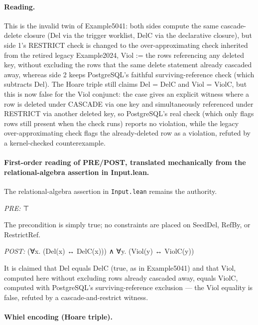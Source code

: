 \documentclass[10pt]{article}
\begin{document}
\paragraph{Reading.} This is the invalid twin of Example5041: both sides compute the same cascade-delete closure (Del via the trigger worklist, DelC via the declarative closure), but side 1's RESTRICT check is changed to the over-approximating check inherited from the retired legacy Example2024, Viol := the rows referencing any deleted key, without excluding the rows that the same delete statement already cascaded away, whereas side 2 keeps PostgreSQL's faithful surviving-reference check (which subtracts Del). The Hoare triple still claims Del = DelC and Viol = ViolC, but this is now false for the Viol conjunct: the case gives an explicit witness where a row is deleted under CASCADE via one key and simultaneously referenced under RESTRICT via another deleted key, so PostgreSQL's real check (which only flags rows still present when the check runs) reports no violation, while the legacy over-approximating check flags the already-deleted row as a violation, refuted by a kernel-checked counterexample.

\paragraph{First-order reading of PRE/POST, translated mechanically from the relational-algebra assertion in Input.lean.} The relational-algebra assertion in \texttt{Input.lean} remains the authority.

\textit{PRE:} ⊤\par The precondition is simply true; no constraints are placed on SeedDel, RefBy, or RestrictRef.

\textit{POST:} (∀x. (Del(x) ↔ DelC(x))) ∧ ∀y. (Viol(y) ↔ ViolC(y))\par It is claimed that Del equals DelC (true, as in Example5041) and that Viol, computed here without excluding rows already cascaded away, equals ViolC, computed with PostgreSQL's surviving-reference exclusion --- the Viol equality is false, refuted by a cascade-and-restrict witness.

\paragraph{Whiel encoding (Hoare triple).}
\end{document}
